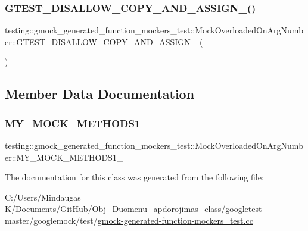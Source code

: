 \subsubsection{\texorpdfstring{GTEST\_DISALLOW\_COPY\_AND\_ASSIGN\_()}{GTEST\_DISALLOW\_COPY\_AND\_ASSIGN\_()}\hspace{0.1cm}{\footnotesize\ttfamily [3/3]}}
{\footnotesize\ttfamily testing\+::gmock\+\_\+generated\+\_\+function\+\_\+mockers\+\_\+test\+::\+Mock\+Overloaded\+On\+Arg\+Number\+::\+G\+T\+E\+S\+T\+\_\+\+D\+I\+S\+A\+L\+L\+O\+W\+\_\+\+C\+O\+P\+Y\+\_\+\+A\+N\+D\+\_\+\+A\+S\+S\+I\+G\+N\+\_\+ (\begin{DoxyParamCaption}\item[{\mbox{\hyperlink{classtesting_1_1gmock__generated__function__mockers__test_1_1_mock_overloaded_on_arg_number}{Mock\+Overloaded\+On\+Arg\+Number}}}]{ }\end{DoxyParamCaption})\hspace{0.3cm}{\ttfamily [private]}}



\subsection{Member Data Documentation}
\mbox{\label{classtesting_1_1gmock__generated__function__mockers__test_1_1_mock_overloaded_on_arg_number_a5076ebd17fb1cc93952b4a80fe6de894}} 
\subsubsection{\texorpdfstring{MY\_MOCK\_METHODS1\_}{MY\_MOCK\_METHODS1\_}}
{\footnotesize\ttfamily testing\+::gmock\+\_\+generated\+\_\+function\+\_\+mockers\+\_\+test\+::\+Mock\+Overloaded\+On\+Arg\+Number\+::\+M\+Y\+\_\+\+M\+O\+C\+K\+\_\+\+M\+E\+T\+H\+O\+D\+S1\+\_\+}



The documentation for this class was generated from the following file\+:\begin{DoxyCompactItemize}
\item 
C\+:/\+Users/\+Mindaugas K/\+Documents/\+Git\+Hub/\+Obj\+\_\+\+Duomenu\+\_\+apdorojimas\+\_\+class/googletest-\/master/googlemock/test/\mbox{\hyperlink{googletest-master_2googlemock_2test_2gmock-generated-function-mockers__test_8cc}{gmock-\/generated-\/function-\/mockers\+\_\+test.\+cc}}\end{DoxyCompactItemize}
